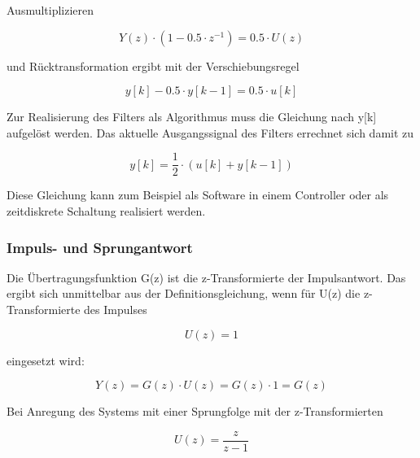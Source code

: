 \noindent Ausmultiplizieren

\begin{equation}\label{eq:sixtwentynine}
Y\left(z\right)\cdot \left(1-0.5\cdot z^{-1} \right)=0.5\cdot U\left(z\right)
\end{equation}

\noindent und R\"{u}cktransformation ergibt mit der Verschiebungsregel 

\begin{equation}\label{eq:sixthirty}
y\left[k\right]-0.5\cdot y\left[k-1\right]=0.5\cdot u\left[k\right]
\end{equation}

\noindent Zur Realisierung des Filters als Algorithmus muss die Gleichung nach y[k] aufgel\"{o}st werden. Das aktuelle Ausgangssignal des Filters errechnet sich damit zu

\begin{equation}\label{eq:sixthirtyone}
y\left[k\right]=\frac{1}{2} \cdot \left(u\left[k\right]+y\left[k-1\right]\right)
\end{equation}

\noindent Diese Gleichung kann zum Beispiel als Software in einem Controller oder als zeitdiskrete Schaltung realisiert werden.

\subsubsection{Impuls- und Sprungantwort}

\noindent Die \"{U}bertragungsfunktion G(z) ist die z-Transformierte der Impulsantwort. Das ergibt sich unmittelbar aus der Definitionsgleichung, wenn f\"{u}r U(z) die z-Transformierte des Impulses 

\begin{equation}\label{eq:sixthirtytwo}
U\left(z\right)=1
\end{equation}

\noindent eingesetzt wird:

\begin{equation}\label{eq:sixthirtythree}
Y\left(z\right)=G\left(z\right)\cdot U\left(z\right)=G\left(z\right)\cdot 1=G\left(z\right)
\end{equation}

\noindent Bei Anregung des Systems mit einer Sprungfolge mit der z-Transformierten

\begin{equation}\label{eq:sixthirtyfour}
U\left(z\right)=\frac{z}{z-1}
\end{equation}

